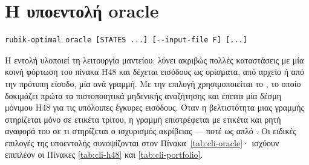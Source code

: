 \section{Η υποεντολή oracle}
\label{sec:cli-oracle}

\begin{verbatim}
rubik-optimal oracle [STATES ...] [--input-file F] [...]
\end{verbatim}

Η εντολή υλοποιεί τη λειτουργία μαντείου: λύνει ακριβώς πολλές καταστάσεις με μία κοινή φόρτωση του πίνακα H48 και δέχεται εισόδους ως ορίσματα, από αρχείο ή από την πρότυπη είσοδο, μία ανά γραμμή. Με την επιλογή  χρησιμοποιείται το , το οποίο δοκιμάζει πρώτα τα πιστοποιητικά μηδενικής αναζήτησης και έπειτα μία δέσμη μόνιμου H48 για τις υπόλοιπες έγκυρες εισόδους. Όταν η βελτιστότητα μιας γραμμής στηρίζεται μόνο σε ετικέτα τρίτου, η γραμμή επιστρέφεται με ετικέτα  και ρητή αναφορά του σε τι στηρίζεται ο ισχυρισμός ακρίβειας — ποτέ ως απλό . Οι ειδικές επιλογές της υποεντολής συνοψίζονται στον Πίνακα~\ref{tab:cli-oracle}· ισχύουν επιπλέον οι Πίνακες \ref{tab:cli-h48} και \ref{tab:cli-portfolio}.

